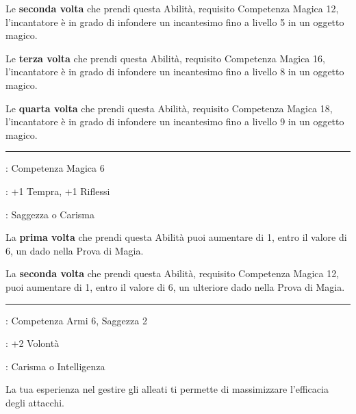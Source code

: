 \begin{multicols}{2}
Le \textbf{seconda volta} che prendi questa Abilità, requisito Competenza Magica 12, l'incantatore è in grado di infondere un incantesimo fino a livello 5 in un oggetto magico.

Le \textbf{terza volta} che prendi questa Abilità, requisito Competenza Magica 16, l'incantatore è in grado di infondere un incantesimo fino a livello 8 in un oggetto magico.

Le \textbf{quarta volta} che prendi questa Abilità, requisito Competenza Magica 18, l'incantatore è in grado di infondere un incantesimo fino a livello 9 in un oggetto magico.

\smallskip\noindent\rule{\linewidth}{2pt} \hypertarget{Dadi Truccati}{}\medskip{}
\noindent
\begin{description}[noitemsep, topsep=0pt, parsep=0pt, partopsep=0pt, leftmargin=0cm, labelwidth=2.5cm]
    \item[\textbf{Requisito}]: Competenza Magica 6
    \item[\textbf{Tiri Salvezza}]: +1 Tempra, +1 Riflessi
    \item[\textbf{Caratteristica}]: Saggezza o Carisma
\end{description}

La \textbf{prima volta} che prendi questa Abilità puoi aumentare di 1, entro il valore di 6, un dado nella Prova di Magia.

La \textbf{seconda volta} che prendi questa Abilità, requisito Competenza Magica 12, puoi aumentare di 1, entro il valore di 6, un ulteriore dado nella Prova di Magia.

\smallskip\noindent\rule{\linewidth}{2pt} \hypertarget{Danno Coordinato}{}\medskip{}
\noindent
\begin{description}[noitemsep, topsep=0pt, parsep=0pt, partopsep=0pt, leftmargin=0cm, labelwidth=2.5cm]
    \item[\textbf{Requisito}]: Competenza Armi 6, Saggezza 2
    \item[\textbf{Tiri Salvezza}]: +2 Volontà
    \item[\textbf{Caratteristica}]: Carisma o Intelligenza
\end{description}

La tua esperienza nel gestire gli alleati ti permette di massimizzare l'efficacia degli attacchi.


\end{multicols}
